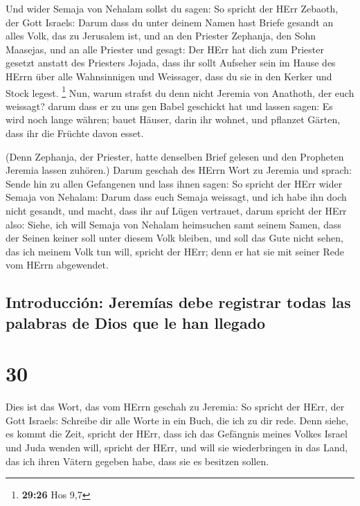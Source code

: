  Und wider Semaja von Nehalam sollst du sagen:
 So spricht der HErr Zebaoth, der Gott Israels: Darum
dass du unter deinem Namen hast Briefe gesandt an alles Volk, das zu
Jerusalem ist, und an den Priester Zephanja, den Sohn Maasejas, und an
alle Priester und gesagt:  Der HErr hat dich zum Priester
gesetzt anstatt des Priesters Jojada, dass ihr sollt Aufseher sein im
Hause des HErrn über alle Wahnsinnigen und Weissager, dass du sie in den
Kerker und Stock legest. \footnote{\textbf{29:26} Hos 9,7}
 Nun, warum strafst du denn nicht Jeremia von Anathoth,
der euch weissagt?  darum dass er zu uns gen Babel
geschickt hat und lassen sagen: Es wird noch lange währen; bauet Häuser,
darin ihr wohnet, und pflanzet Gärten, dass ihr die Früchte davon esset.

 (Denn Zephanja, der Priester, hatte denselben Brief
gelesen und den Propheten Jeremia lassen zuhören.)  Darum
geschah des HErrn Wort zu Jeremia und sprach:  Sende hin
zu allen Gefangenen und lass ihnen sagen: So spricht der HErr wider
Semaja von Nehalam: Darum dass euch Semaja weissagt, und ich habe ihn
doch nicht gesandt, und macht, dass ihr auf Lügen vertrauet,
 darum spricht der HErr also: Siehe, ich will Semaja von
Nehalam heimsuchen samt seinem Samen, dass der Seinen keiner soll unter
diesem Volk bleiben, und soll das Gute nicht sehen, das ich meinem Volk
tun will, spricht der HErr; denn er hat sie mit seiner Rede vom HErrn
abgewendet.

\hypertarget{introducciuxf3n-jeremuxedas-debe-registrar-todas-las-palabras-de-dios-que-le-han-llegado}{%
\subsection{Introducción: Jeremías debe registrar todas las palabras de
Dios que le han
llegado}\label{introducciuxf3n-jeremuxedas-debe-registrar-todas-las-palabras-de-dios-que-le-han-llegado}}

\hypertarget{section-29}{%
\section{30}\label{section-29}}

 Dies ist das Wort, das vom HErrn geschah zu Jeremia:
 So spricht der HErr, der Gott Israels: Schreibe dir alle
Worte in ein Buch, die ich zu dir rede.  Denn siehe, es
kommt die Zeit, spricht der HErr, dass ich das Gefängnis meines Volkes
Israel und Juda wenden will, spricht der HErr, und will sie
wiederbringen in das Land, das ich ihren Vätern gegeben habe, dass sie
es besitzen sollen.


